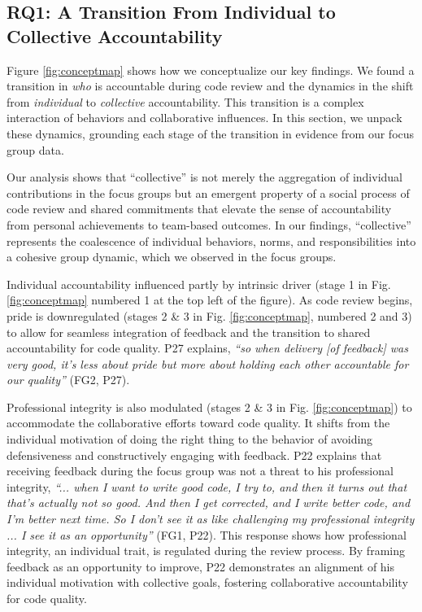 \subsection{RQ1: A Transition From Individual to Collective Accountability}\label{sec:f2}

Figure \ref{fig:conceptmap} shows how we conceptualize our key findings. We found a transition in \emph{who} is accountable during code review and the dynamics in the shift from \emph{individual} to \emph{collective} accountability. This transition is a complex interaction of behaviors and collaborative influences. In this section, we unpack these dynamics, grounding each stage of the transition in evidence from our focus group data.

Our analysis shows that ``collective'' is not merely the aggregation of individual contributions in the focus groups but an emergent property of a social process of code review and shared commitments that elevate the sense of accountability from personal achievements to team-based outcomes. In our findings, ``collective'' represents the coalescence of individual behaviors, norms, and responsibilities into a cohesive group dynamic, which we observed in the focus groups.

Individual accountability influenced partly by intrinsic driver (stage 1 in Fig. \ref{fig:conceptmap} numbered 1 at the top left of the figure). As code review begins, pride is downregulated (stages 2 \& 3 in Fig. \ref{fig:conceptmap}, numbered 2 and 3) to allow for seamless integration of feedback and the transition to shared accountability for code quality. P27 explains, \emph{``so when delivery [of feedback] was very good, it's less about pride but more about holding each other accountable for our quality''} (FG2, P27).

Professional integrity is also modulated (stages 2 \& 3 in Fig. \ref{fig:conceptmap}) to accommodate the collaborative efforts toward code quality. It shifts from the individual motivation of doing the right thing to the behavior of avoiding defensiveness and constructively engaging with feedback. P22 explains that receiving feedback during the focus group was not a threat to his professional integrity, \emph{``... when I want to write good code, I try to, and then it turns out that that's actually not so good. And then I get corrected, and I write better code, and I'm better next time. So I don't see it as like challenging my professional integrity ... I see it as an opportunity''} (FG1, P22). This response shows how professional integrity, an individual trait, is regulated during the review process. By framing feedback as an opportunity to improve, P22 demonstrates an alignment of his individual motivation with collective goals, fostering collaborative accountability for code quality.

